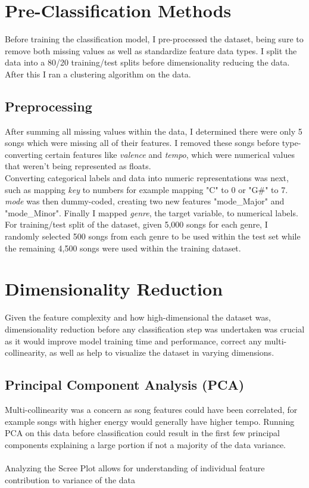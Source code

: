 \documentclass[12pt]{article}
\begin{document}
\section{\textbf{Pre-Classification Methods}}
Before training the classification model, I pre-processed the dataset, being sure to remove both missing values as well as standardize feature data types. I split the data into a 80/20 training/test splits before dimensionality reducing the data. After this I ran a clustering algorithm on the data.
\subsection*{\textbf{Preprocessing}}
After summing all missing values within the data, I determined there were only 5 songs which were missing all of their features. I removed these songs before type-converting certain features like \textit{valence} and \textit{tempo}, which were numerical values that weren't being represented as floats. \\ 

\noindent
Converting categorical labels and data into numeric representations was next, such as mapping \textit{key} to numbers for example mapping "C" to 0 or "G\#" to 7. \textit{mode} was then dummy-coded, creating two new features "mode\_Major" and "mode\_Minor". Finally I mapped \textit{genre}, the target variable, to numerical labels. \\

\noindent
For training/test split of the dataset, given 5,000 songs for each genre, I randomly selected 500 songs from each genre to be used within the test set while the remaining 4,500 songs were used within the training dataset.

\section*{\textbf{Dimensionality Reduction}}
Given the feature complexity and how high-dimensional the dataset was, dimensionality reduction before any classification step was undertaken was crucial as it would improve model training time and performance, correct any multi-collinearity, as well as help to visualize the dataset in varying dimensions.

\subsection*{\textbf{Principal Component Analysis (PCA)}}
Multi-collinearity was a concern as song features could have been correlated, for example songs with higher energy would generally have higher tempo. Running PCA on this data before classification could result in the first few principal components explaining a large portion if not a majority of the data variance. \\ \\
Analyzing the Scree Plot allows for understanding of individual feature contribution to variance of the data 
\end{document}
